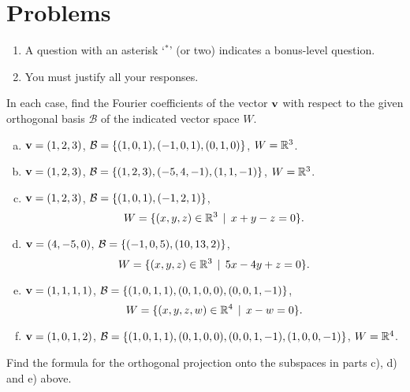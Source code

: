 \section*{Problems}
 
\begin{enumerate}
\item A question with an asterisk `$ ^\ast$' (or two) indicates a bonus-level question.
 \item You must justify all your responses.
\end{enumerate}
\bigskip

\begin{prob} \label{prob19.1} In each case, find the Fourier coefficients of the vector $\mathbf{v}$ with respect to the given orthogonal basis $\mathcal B$  of the indicated vector space $W$.
\medskip

\begin{enumerate}[a)]
\item  $\mathbf{v}=(1,2,3)$, $\mathcal B = \{(1,0,1),(-1,0,1), (0,1,0)  \}$, $W=\mathbb{R}^3$.
\medskip
%
\item\sov  $\mathbf{v}=(1,2,3)$, $\mathcal B = \{(1, 2 , 3 ),(-5, 4, -1),(1, 1, -1) \}$, $W=\mathbb{R}^3$.
\medskip
%
\item  $\mathbf{v}=(1,2,3)$, $\mathcal B = \{(1, 0, 1),(-1, 2, 1) \}$, $$W=\{(x,y,z)\in\mathbb{R}^3 \,\mid \, x+y-z=0 \}.$$
 
%
\item\sov $\mathbf{v}=(4,-5,0)$, $\mathcal B = \{(-1, 0, 5),(10, 13, 2) \}$, $$W=\{(x,y,z)\in\mathbb{R}^3 \,\mid \, 5x-4y+z=0 \}.$$
 
%
\item $\mathbf{v}=(1,1,1,1)$,  $\mathcal B =\{(1, 0, 1, 1), (0, 1, 0, 0), (0, 0, 1, -1) \}$, $$W=\{(x,y,z, w)\in\mathbb{R}^4 \,\mid \, x-w=0 \}.$$
\medskip
%
\item\sov $\mathbf{v}=(1,0,1,2)$,  $\mathcal B =\{(1, 0, 1, 1), (0, 1, 0, 0), (0, 0, 1, -1),(1, 0, 0, -1) \}$, $W= \mathbb{R}^4$.
\medskip
%
\end{enumerate}

\end{prob} \begin{prob} \label{prob19.2} Find the formula for the orthogonal projection onto the subspaces in parts c), d) \sov and e) above.


\end{prob}
